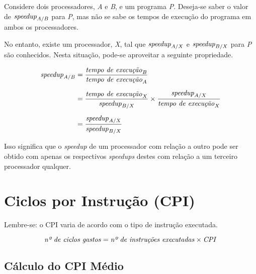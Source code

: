 \documentclass[12pt]{article}
\newcommand{\Text}[1]{\textrm{\textit{#1}}}
\begin{document}
Considere dois processadores, \emph{A} e \emph{B}, e um programa \emph{P}. Deseja-se saber o valor de \( \Text{speedup}_{A/B} \) para \emph{P}, mas não se sabe os tempos de execução do programa em ambos os processadores.

No entanto, existe um processador, \emph{X}, tal que \( \Text{speedup}_{A/X} \) e \( \Text{speedup}_{B/X} \) para \emph{P} são conhecidos. Nesta situação, pode-se aproveitar a seguinte propriedade.

\begin{align*}
  \Text{speedup}_{A/B}
  &= \frac{\Text{tempo de execução}_B}{\Text{tempo de execução}_A} \\[\medskipamount]
  &= \frac{\Text{tempo de execução}_X}{\Text{speedup}_{B/X}} \times
     \frac{\Text{speedup}_{A/X}}{\Text{tempo de execução}_X}\\[\medskipamount]
  &= \frac{\Text{speedup}_{A/X}}{\Text{speedup}_{B/X}}
\end{align*}


Isso significa que o \textit{speedup} de um processador com relação a outro pode ser obtido com apenas os respectivos \textit{speedups} destes com relação a um terceiro processador qualquer.


\section{Ciclos por Instrução (CPI)}


Lembre-se: o CPI varia de acordo com o tipo de instrução executada.

\begin{equation} \label{eq:numciclosclock}
  \Text{nº de ciclos gastos} = \Text{nº de instruções executadas} \times \Text{CPI}
\end{equation}


\subsection{Cálculo do CPI Médio}
\end{document}
